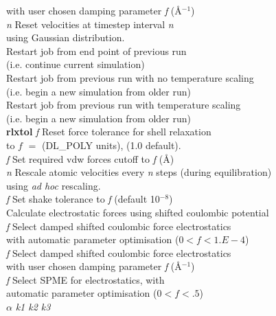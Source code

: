 \begin{tabbing}
\> \> with user chosen damping parameter {\em f} (\AA$^{-1}$)\\
 {\em n} \> Reset velocities at timestep interval {\em n}\\
\> \> using Gaussian distribution.\\
 \> Restart job from end point of previous run\\
\> \> (i.e. continue current simulation)\\
 \> Restart job from previous run with no temperature
scaling\\
\> \> (i.e. begin a new simulation from older run)\\
 \> Restart job from previous run with temperature
scaling\\
\> \> (i.e. begin a new simulation from older run)\\
\> {\bf rlxtol} {\em f} \> Reset force tolerance for shell relaxation\\
\> \> to $f$ $=$ (DL\_POLY units), (1.0 default).\\
  {\em f}  \> Set required vdw forces cutoff to {\em f} (\AA)\\
 {\em n} \> Rescale atomic velocities every {\em n} steps
(during equilibration) \\
\> \> using {\em ad hoc} rescaling. \\
 {\em f} \> Set shake tolerance to {\em f}  (default
10$^{-8}$)\\
 \> Calculate  electrostatic forces using 
shifted
coulombic potential\\
 {\em f}\> Select damped shifted coulombic force electrostatics
\\
\> \> with automatic parameter optimisation ($0<f<1.E-4$) \\
 {\em f}\> Select damped shifted coulombic force electrostatics
\\
\> \> with user chosen damping parameter {\em f} (\AA$^{-1}$)\\
 {\em f} \>Select SPME for electrostatics, with  \\
\> \>automatic parameter optimisation ($0<f<.5$) \\
  $\alpha$ {\em k1 k2 k3} \\

\end{tabbing}
